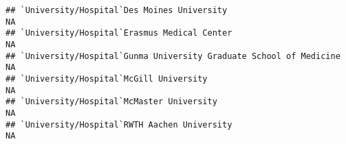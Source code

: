 \documentclass[]{article}
\begin{document}
\begin{verbatim}
## `University/Hospital`Des Moines University                                                                                                                                                                                                                                                                                                                                                                                                                                            NA
## `University/Hospital`Erasmus Medical Center                                                                                                                                                                                                                                                                                                                                                                                                                                           NA
## `University/Hospital`Gunma University Graduate School of Medicine                                                                                                                                                                                                                                                                                                                                                                                                                     NA
## `University/Hospital`McGill University                                                                                                                                                                                                                                                                                                                                                                                                                                                NA
## `University/Hospital`McMaster University                                                                                                                                                                                                                                                                                                                                                                                                                                              NA
## `University/Hospital`RWTH Aachen University                                                                                                                                                                                                                                                                                                                                                                                                                                           NA

\end{verbatim}
\end{document}
